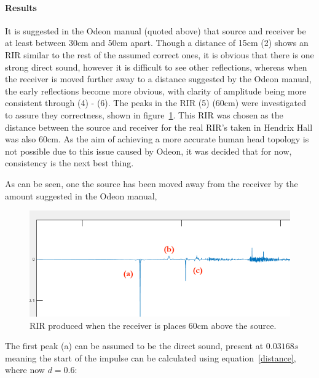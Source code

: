 \documentclass[../../main.tex]{subfiles}
\begin{document}
			\paragraph{Results}
			\label{odeon:results}

			It is suggested in the Odeon manual (quoted above) that source and receiver be at least between 30cm and 50cm apart. Though a distance of 15cm (2) shows an \ac{RIR} similar to the rest of the assumed correct ones, it is obvious that there is one strong direct sound, however it is difficult to see other reflections, whereas when the receiver is moved further away to a distance suggested by the Odeon manual, the early reflections become more obvious, with clarity of amplitude being more consistent through (4) - (6). The peaks in the RIR (5) (60cm) were investigated to assure they correctness, shown in figure~\ref{60cm}. This \ac{RIR} was chosen as the distance between the source and receiver for the real RIR’s taken in Hendrix Hall was also 60cm. As the aim of achieving a more accurate human head topology is not possible due to this issue caused by Odeon, it was decided that for now, consistency is the next best thing.

			As can be seen, one the source has been moved away from the receiver by the amount suggested in the Odeon manual,

			\begin{figure}[H]
				\centerline{\includegraphics[scale = 0.6]{Sections/Implementation/Odeon/images/incorrectRIR/76_60cm_editV2_crop.png}}
				\caption{\ac{RIR} produced when the receiver is places 60cm above the source.}
				\label{60cm}
			\end{figure}

			The first peak (a) can be assumed to be the direct sound, present at $0.03168s$ meaning the start of the impulse can be calculated using equation~\ref{distance}, where now $d = 0.6$:
\end{document}
